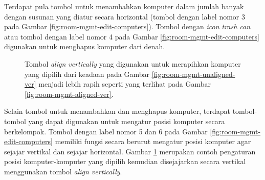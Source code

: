 \documentclass[a4paper,twoside]{article}
\begin{document}
\begin{enumerate}
\begin{itemize}
\begin{itemize}
                Terdapat pula tombol untuk menambahkan komputer dalam jumlah banyak dengan susunan yang diatur secara horizontal (tombol dengan label nomor 3 pada Gambar \ref{fig:room-mgmt-edit-computers}). Tombol dengan \textit{icon trash can} atau tombol dengan label nomor 4 pada Gambar \ref{fig:room-mgmt-edit-computers} digunakan untuk menghapus komputer dari denah.
                
                
                \begin{figure}[H]
                \centering
                 \hfill
                 \caption{Tombol \textit{align vertically} yang digunakan untuk merapihkan komputer yang dipilih dari keadaan pada Gambar \ref{fig:room-mgmt-unaligned-ver} menjadi lebih rapih seperti yang terlihat pada Gambar \ref{fig:room-mgmt-aligned-ver}.}
                 \label{fig:room-mgmt-aligning-ver}
                \end{figure}
                
                Selain tombol untuk menambahkan dan menghapus komputer, terdapat tombol-tombol yang dapat digunakan untuk mengatur posisi komputer secara berkelompok. Tombol dengan label nomor 5 dan 6 pada Gambar \ref{fig:room-mgmt-edit-computers} memiliki fungsi secara berurut mengatur posisi komputer agar sejajar vertikal dan sejajar horizontal. Gambar \ref{fig:room-mgmt-aligning-ver} merupakan contoh pengaturan posisi komputer-komputer yang dipilih kemudian disejajarkan secara vertikal menggunakan tombol \textit{align vertically}.
                

\end{itemize}
\end{itemize}
\end{enumerate}
\end{document}
